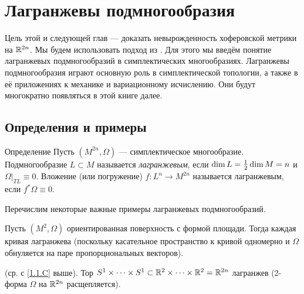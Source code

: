 \chapter{Лагранжевы подмногообразия}\label{chap:3}

Цель этой и следующей глав --- доказать невырожденность хоферовской метрики на $\mathbb{R}^{2n}$.
Мы будем использовать подход из \cite{P1}.
Для этого мы введём понятие лагранжевых подмногообразий в симплектических многообразиях.
Лагранжевы подмногообразия играют основную роль в симплектической топологии, а также в её приложениях к механике и вариационному исчислению.
Они будут многократно появляться в этой книге далее.

\section{Определения и примеры}\label{3.1}

\begin{ex*}{Определение}
Пусть $(M^{2n}, \Omega)$ --- симплектическое многообразие.
Подмногообразие $L \subset M$ называется \emph{лагранжевым}, если $\dim L \z= \tfrac12 \dim M = n$ и $\Omega|_{TL} \equiv 0$.
Вложение (или погружение) $f\colon L^n \to M^{2n}$ называется лагранжевым, если $f^\ast \Omega \equiv 0$.
\end{ex*}

Перечислим некоторые важные примеры лагранжевых подмногообразий.

\begin{ex}{}\label{3.1.A} 
Пусть $(M^2, \Omega)$ ориентированная поверхность с формой площади.
Тогда каждая кривая лагранжева (поскольку касательное пространство к кривой одномерно и $\Omega$ обнуляется на паре пропорциональных векторов).
\end{ex}


\begin{ex}{}\label{3.1.B} (ср. с \ref{1.1.C} выше).
Тор $S^1 \times\dots\times S^1
\subset 
\mathbb{R}^2\times\dots\times \mathbb{R}^2 
= 
\mathbb{R}^{2n}$ лагранжев (2-форма $\Omega$ на $\mathbb{R}^{2n}$ расщепляется).
\end{ex}



